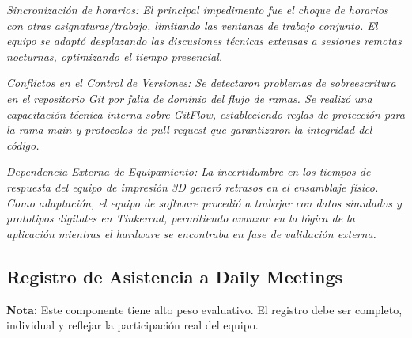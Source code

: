\documentclass[11pt, a4paper]{article}
\begin{document}
\textit{Sincronización de horarios: El principal impedimento fue el choque de horarios con otras asignaturas/trabajo, limitando las ventanas de trabajo conjunto. El equipo se adaptó desplazando las discusiones técnicas extensas a sesiones remotas nocturnas, optimizando el tiempo presencial.}

\textit{Conflictos en el Control de Versiones: Se detectaron problemas de sobreescritura en el repositorio Git por falta de dominio del flujo de ramas. Se realizó una capacitación técnica interna sobre GitFlow, estableciendo reglas de protección para la rama main y protocolos de pull request que garantizaron la integridad del código.}

\textit{Dependencia Externa de Equipamiento: La incertidumbre en los tiempos de respuesta del equipo de impresión 3D generó retrasos en el ensamblaje físico. Como adaptación, el equipo de software procedió a trabajar con datos simulados y prototipos digitales en Tinkercad, permitiendo avanzar en la lógica de la aplicación mientras el hardware se encontraba en fase de validación externa.}

\subsection{Registro de Asistencia a Daily Meetings}

\begin{warnbox}
  \textbf{Nota:} Este componente tiene alto peso evaluativo. El registro debe ser completo, individual y reflejar la participación real del equipo.
\end{warnbox}

\vspace{0.2em}
\end{document}

